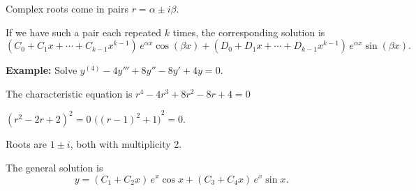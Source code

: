 \documentclass[10pt,aspectratio=169]{beamer}
\begin{document}
\begin{frame}
Complex roots come in pairs $r = \alpha \pm i \beta$.

\medskip
\pause

If we have such a pair each repeated $k$ times,
the corresponding solution is
\[
( C_0 + C_1 x + \cdots + C_{k-1} x^{k-1} ) \, e^{\alpha x} \cos (\beta x)
+
( D_0 + D_1 x + \cdots + D_{k-1} x^{k-1} ) \, e^{\alpha x} \sin (\beta x) .
\]

\pause
\textbf{Example:}
Solve
\quad
$y^{(4)} - 4 y''' + 8 y'' - 8 y' + 4y = 0$.

\medskip
\pause

The characteristic equation is
\quad
$r^4 - 4 r^3 + 8 r^2 - 8 r + 4 = 0$

\pause
\thus
\quad
${(r^2-2r+2)}^2 = 0$
\pause
\wthus
${\bigl({(r-1)}^2+1\bigr)}^2 = 0$.

\medskip
\pause

Roots are $1 \pm i$, both with multiplicity $2$.

\medskip
\pause

The general solution is
\[
y = 
( C_1 + C_2 x ) \, e^{x} \cos x
+
( C_3 + C_4 x ) \, e^{x} \sin x .
\]
\end{frame}
\end{document}
